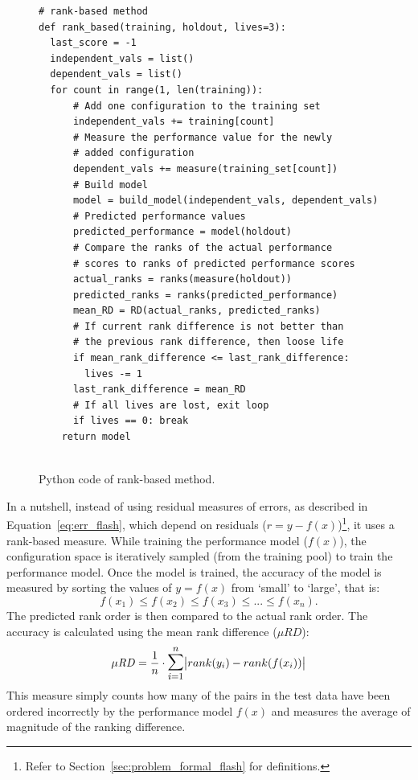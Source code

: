 \begin{figure}[t]
\small
\hspace{0.4cm}\begin{lstlisting}[xrightmargin=5.0ex,mathescape,frame=none,numbers=right]
# rank-based method
def rank_based(training, holdout, lives=3): 
  last_score = -1
  independent_vals = list()
  dependent_vals = list()
  for count in range(1, len(training)):  
      # Add one configuration to the training set
      independent_vals += training[count]      
      # Measure the performance value for the newly
      # added configuration 
      dependent_vals += measure(training_set[count])
      # Build model
      model = build_model(independent_vals, dependent_vals)     
      # Predicted performance values
      predicted_performance = model(holdout) 
      # Compare the ranks of the actual performance 
      # scores to ranks of predicted performance scores
      actual_ranks = ranks(measure(holdout))
      predicted_ranks = ranks(predicted_performance)
      mean_RD = RD(actual_ranks, predicted_ranks)
      # If current rank difference is not better than
      # the previous rank difference, then loose life
      if mean_rank_difference <= last_rank_difference:
        lives -= 1
      last_rank_difference = mean_RD
      # If all lives are lost, exit loop
      if lives == 0: break
    return model
      

\end{lstlisting}
\caption{\small{Python code of rank-based method.}
}
\label{fig:rank-based_flash}  
\end{figure}

In a nutshell, instead of using residual measures of errors, as described in Equation~\ref{eq:err_flash}, which depend on residuals ($r = y - f(x)$)\footnote{Refer to Section~\ref{sec:problem_formal_flash} for definitions.}, it uses a rank-based measure. While training the performance model ($f(x)$), the configuration space is iteratively sampled (from the training pool) to train the performance model. Once the model is trained, the accuracy of the model is measured  by sorting the values of $y=f(x)$ from `small' to `large', that is:
\begin{equation}
    f(x_1) \le f(x_2) \le f(x_3) \le ... \le f(x_n).
\end{equation}
The predicted rank order is then compared to the actual rank order. The accuracy is calculated using the mean rank difference ($\mu RD$):
\begin{equation} \label{eq:rank_performance_flash}
    \mathit{\mu RD} = \frac{1}{n} \cdot \mathlarger{\mathlarger{\sum}}_{i=1}^{n}\abs{rank(y_i) - rank(f(x_i))}
\end{equation}
This measure simply counts how many of the pairs in the test data have been ordered incorrectly by the performance model $f(x)$ and measures the average of magnitude of the ranking difference. 



